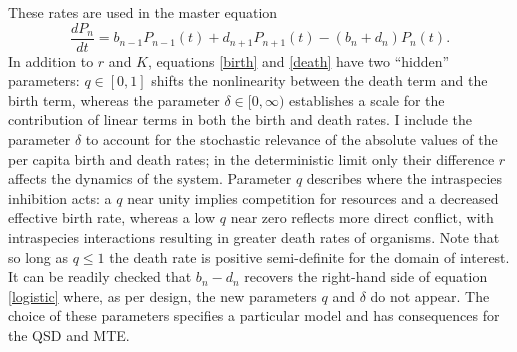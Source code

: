These rates are used in the master equation
\begin{equation}
\frac{dP_n}{dt} =  b_{n-1}P_{n-1}(t) + d_{n+1}P_{n+1}(t) - (b_n+d_n)P_n(t).
\label{master-eqn}
\end{equation}
In addition to $r$ and $K$, equations \ref{birth} and \ref{death} have two ``hidden'' parameters: $q\in[0,1]$ shifts the nonlinearity between the death term and the birth term, whereas the parameter $\delta\in[0,\infty)$ establishes a scale for the contribution of linear terms in both the birth and death rates. 
I include the parameter $\delta$ to account for the stochastic relevance of the absolute values of the per capita birth and death rates; in the deterministic limit only their difference $r$ affects the dynamics of the system. 
Parameter $q$ describes where the intraspecies inhibition acts: a $q$ near unity implies competition for resources and a decreased effective birth rate, whereas a low $q$ near zero reflects more direct conflict, with intraspecies interactions resulting in greater death rates of organisms. 
Note that so long as $q\leq 1$ the death rate is positive semi-definite for the domain of interest. 
It can be readily checked that $b_n-d_n$ recovers the right-hand side of equation \ref{logistic} where, as per design, the new parameters $q$ and $\delta$ do not appear.
The choice of these parameters specifies a particular model and has consequences for the QSD and MTE. 

